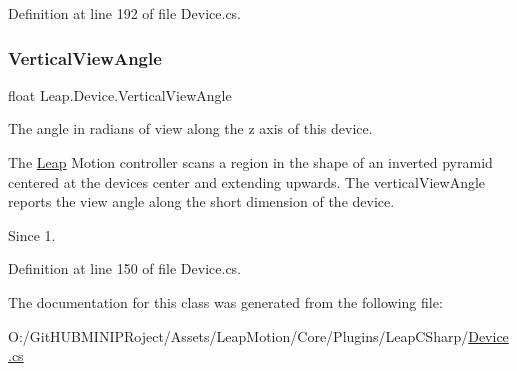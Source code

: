 Definition at line 192 of file Device.\+cs.

\mbox{\label{class_leap_1_1_device_a98badb22460d2fac5fc8e3539b7d035f}} 
\subsubsection{\texorpdfstring{VerticalViewAngle}{VerticalViewAngle}}
{\footnotesize\ttfamily float Leap.\+Device.\+Vertical\+View\+Angle\hspace{0.3cm}{\ttfamily [get]}}



The angle in radians of view along the z axis of this device. 

The \mbox{\hyperlink{namespace_leap}{Leap}} Motion controller scans a region in the shape of an inverted pyramid centered at the device\textquotesingle{}s center and extending upwards. The vertical\+View\+Angle reports the view angle along the short dimension of the device.

\begin{DoxySince}{Since}
1. 
\end{DoxySince}


Definition at line 150 of file Device.\+cs.



The documentation for this class was generated from the following file\+:\begin{DoxyCompactItemize}
\item 
O\+:/\+Git\+H\+U\+B\+M\+I\+N\+I\+P\+Roject/\+Assets/\+Leap\+Motion/\+Core/\+Plugins/\+Leap\+C\+Sharp/\mbox{\hyperlink{_device_8cs}{Device.\+cs}}\end{DoxyCompactItemize}

